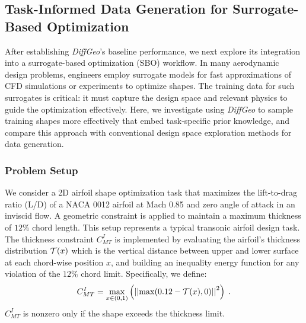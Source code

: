 \subsection{Task-Informed Data Generation for Surrogate-Based Optimization}
\label{ch6:sec:SBO}

After establishing \textit{DiffGeo}’s baseline performance, we next explore its integration into a surrogate-based optimization (SBO) workflow. In many aerodynamic design problems, engineers employ surrogate models for fast approximations of CFD simulations or experiments to optimize shapes. The training data for such surrogates is critical: it must capture the design space and relevant physics to guide the optimization effectively. Here, we investigate using \textit{DiffGeo} to sample training shapes more effectively that embed task-specific prior knowledge, and compare this approach with conventional design space exploration methods for data generation.

\subsubsection{Problem Setup}
We consider a 2D airfoil shape optimization task that maximizes the lift-to-drag ratio (L/D) of a NACA 0012 airfoil at Mach 0.85 and zero angle of attack in an inviscid flow. A geometric constraint is applied to maintain a maximum thickness of $12\%$ chord length. This setup represents a typical transonic airfoil design task. The thickness constraint $C^I_{MT}$ is implemented by evaluating the airfoil’s thickness distribution $\mathcal{T}(x)$ which is the vertical distance between upper and lower surface at each chord-wise position $x$, and building an inequality energy function for any violation of the $12\%$ chord limit. Specifically, we define:
\begin{equation}
    {C^I_{MT}} = \mathop {\max }\limits_{x \in (0,1)} \left( {\left|\left|\max (0.12 - \mathcal{T}(x),0)\right|\right|^2} \right)\;.
\end{equation}
$C^I_{MT}$ is nonzero only if the shape exceeds the thickness limit. 

